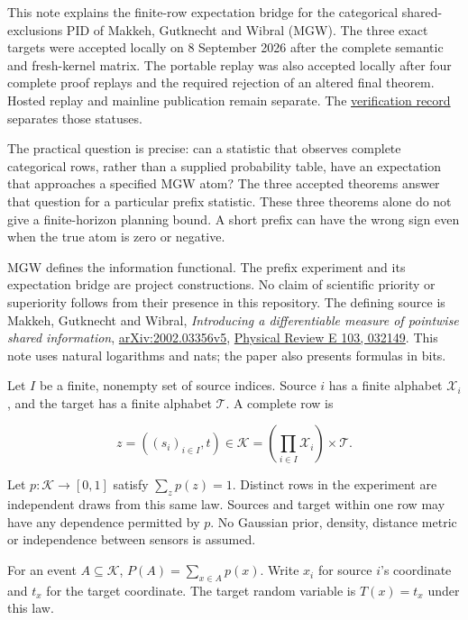 This note explains the finite-row expectation bridge for the categorical shared-exclusions PID of Makkeh, Gutknecht and Wibral (MGW). The three exact targets were accepted locally on 8 September 2026 after the complete semantic and fresh-kernel matrix. The portable replay was also accepted locally after four complete proof replays and the required rejection of an altered final theorem. Hosted replay and mainline publication remain separate. The \href{https://github.com/sepahead/pid-rs/blob/main/audit/evidence/prefix-mgw-mean-formal-verification-2026-09-08/RESULTS.md}{verification record} separates those statuses.

The practical question is precise: can a statistic that observes complete categorical rows, rather than a supplied probability table, have an expectation that approaches a specified MGW atom? The three accepted theorems answer that question for a particular prefix statistic. These three theorems alone do not give a finite-horizon planning bound. A short prefix can have the wrong sign even when the true atom is zero or negative.

MGW defines the information functional. The prefix experiment and its expectation bridge are project constructions. No claim of scientific priority or superiority follows from their presence in this repository. The defining source is Makkeh, Gutknecht and Wibral, \emph{Introducing a differentiable measure of pointwise shared information}, \href{https://arxiv.org/abs/2002.03356v5}{arXiv:2002.03356v5}, \href{https://doi.org/10.1103/PhysRevE.103.032149}{Physical Review E 103, 032149}. This note uses natural logarithms and nats; the paper also presents formulas in bits.

\label{data-law-and-information-question}

Let \(I\) be a finite, nonempty set of source indices. Source \(i\) has a finite alphabet \(\mathcal X_i\), and the target has a finite alphabet \(\mathcal T\). A complete row is

\[
z=((s_i)_{i\in I},t)\in\mathcal K
   =\left(\prod_{i\in I}\mathcal X_i\right)\times\mathcal T.
\]

Let \(p:\mathcal K\to[0,1]\) satisfy \(\sum_zp(z)=1\). Distinct rows in the experiment are independent draws from this same law. Sources and target within one row may have any dependence permitted by \(p\). No Gaussian prior, density, distance metric or independence between sensors is assumed.

For an event \(A\subseteq\mathcal K\), \(P(A)=\sum_{x\in A}p(x)\). Write \(x_i\) for source \(i\)'s coordinate and \(t_x\) for the target coordinate. The target random variable is \(T(x)=t_x\) under this law.

